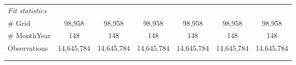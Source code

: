\begin{table}[htbp]
\begin{tabular}{lcccccc}
      \midrule
      \emph{Fit statistics}\\
      \# Grid                                                             & 98,958        & 98,958        & 98,958        & 98,958        & 98,958        & 98,958\\  
      \# MonthYear                                                        & 148           & 148           & 148           & 148           & 148           & 148\\  
      Observations                                                        & 14,645,784    & 14,645,784    & 14,645,784    & 14,645,784    & 14,645,784    & 14,645,784\\  
      \midrule \midrule
                                                                          &               &               &               &               &               &  \tabularnewline 
      \\
   \end{tabular}
\end{table}


